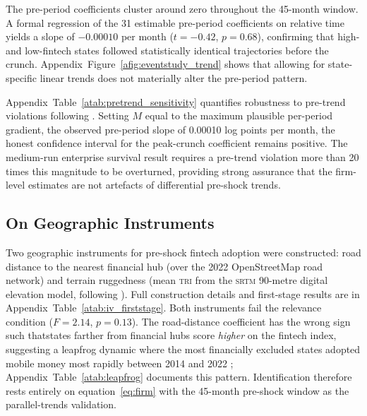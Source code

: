 The pre-period coefficients cluster around zero throughout the 45-month window.
A formal regression of the 31 estimable pre-period coefficients on relative
time yields a slope of $-0.00010$ per month ($t = -0.42$, $p = 0.68$),
confirming that high- and low-fintech states followed statistically identical
\NTL{} trajectories before the crunch. Appendix~Figure~\ref{afig:eventstudy_trend}
shows that allowing for state-specific linear trends does not materially alter
the pre-period pattern.

Appendix~Table~\ref{atab:pretrend_sensitivity} quantifies robustness to
pre-trend violations following \citet{rambachandran2023pretrends}. Setting
$M$ equal to the maximum plausible per-period gradient, the observed
pre-period slope of 0.00010 log points per month, the honest confidence
interval for the peak-crunch coefficient remains positive. The medium-run
enterprise survival result requires a pre-trend violation more than 20 times
this magnitude to be overturned, providing strong assurance that the
firm-level estimates are not artefacts of differential pre-shock trends.

\subsection{On Geographic Instruments}
\label{sub:iv}

Two geographic instruments for pre-shock fintech adoption were constructed:
road distance to the nearest financial hub (over the 2022 OpenStreetMap road
network) and terrain ruggedness (mean \textsc{tri} from the \textsc{srtm}
90-metre digital elevation model, following \citealt{hjort2019arrival}). Full
construction details and first-stage results are in
Appendix~Table~\ref{atab:iv_firststage}. Both instruments fail the relevance
condition ($F = 2.14$, $p = 0.13$). The road-distance coefficient has the
wrong sign such thatstates farther from financial hubs score \emph{higher} on
the fintech index, suggesting a leapfrog dynamic where the most financially
excluded states adopted mobile money most rapidly between 2014 and
2022 \citep{suri2016mobile}; Appendix~Table~\ref{atab:leapfrog} documents
this pattern. Identification therefore rests entirely on
equation~\eqref{eq:firm} with the 45-month pre-shock \NTL{} window as the
parallel-trends validation.
